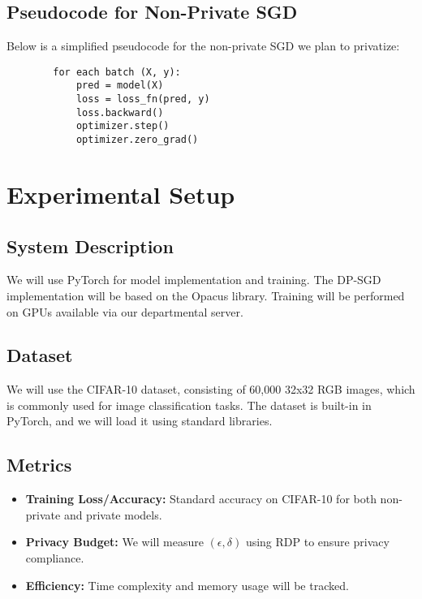 \documentclass{article}
\begin{document}
    \subsection{Pseudocode for Non-Private SGD}\label{subsec:pseudo-code-for-non-private-sgd}
    Below is a simplified pseudocode for the non-private SGD we plan to privatize:
    \begin{verbatim}
        for each batch (X, y):
            pred = model(X)
            loss = loss_fn(pred, y)
            loss.backward()
            optimizer.step()
            optimizer.zero_grad()
    \end{verbatim}


    \section{Experimental Setup}\label{sec:experimental-setup}

    \subsection{System Description}\label{subsec:system-description}
    We will use PyTorch for model implementation and training.
    The DP-SGD implementation will be based on the Opacus library.
    Training will be performed on GPUs available via our departmental server.

    \subsection{Dataset}\label{subsec:dataset}
    We will use the CIFAR-10 dataset, consisting of 60,000 32x32 RGB images, which is commonly used for
    image classification tasks.
    The dataset is built-in in PyTorch, and we will load it using standard libraries.

    \subsection{Metrics}\label{subsec:metrics}
    \begin{itemize}
        \item \textbf{Training Loss/Accuracy:} Standard accuracy on CIFAR-10 for both non-private and private models.
        \item \textbf{Privacy Budget:} We will measure $(\epsilon, \delta)$ using RDP to ensure privacy compliance.
        \item \textbf{Efficiency:} Time complexity and memory usage will be tracked.
    \end{itemize}
\end{document}
